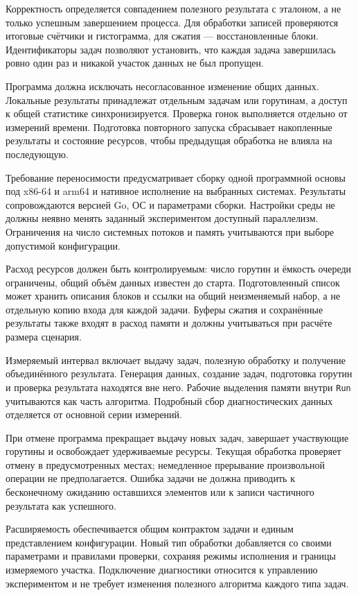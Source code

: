 Корректность определяется совпадением полезного результата с эталоном, а не только успешным
  завершением процесса. Для обработки записей проверяются итоговые счётчики и гистограмма,
  для сжатия — восстановленные блоки. Идентификаторы задач позволяют установить, что каждая
  задача завершилась ровно один раз и никакой участок данных не был пропущен.

Программа должна исключать несогласованное изменение общих данных. Локальные результаты
  принадлежат отдельным задачам или горутинам, а доступ к общей статистике синхронизируется.
  Проверка гонок выполняется отдельно от измерений времени. Подготовка повторного запуска
  сбрасывает накопленные результаты и состояние ресурсов, чтобы предыдущая обработка
  не влияла на последующую.

Требование переносимости предусматривает сборку одной программной основы под x86-64 и arm64
  и нативное исполнение на выбранных системах. Результаты сопровождаются версией Go, ОС
  и параметрами сборки. Настройки среды не должны неявно менять заданный экспериментом
  доступный параллелизм. Ограничения на число системных потоков и память учитываются при
  выборе допустимой конфигурации.

Расход ресурсов должен быть контролируемым: число горутин и ёмкость очереди ограничены,
  общий объём данных известен до старта. Подготовленный список может хранить описания блоков
  и ссылки на общий неизменяемый набор, а не отдельную копию входа для каждой задачи.
  Буферы сжатия и сохранённые результаты также входят в расход памяти и должны учитываться
  при расчёте размера сценария.

Измеряемый интервал включает выдачу задач, полезную обработку и получение объединённого
  результата. Генерация данных, создание задач, подготовка горутин и проверка результата
  находятся вне него. Рабочие выделения памяти внутри \texttt{Run} учитываются как часть
  алгоритма. Подробный сбор диагностических данных отделяется от основной серии измерений.

При отмене программа прекращает выдачу новых задач, завершает участвующие горутины и освобождает
  удерживаемые ресурсы. Текущая обработка проверяет отмену в предусмотренных местах; немедленное
  прерывание произвольной операции не предполагается. Ошибка задачи не должна приводить
  к бесконечному ожиданию оставшихся элементов или к записи частичного результата как успешного.

Расширяемость обеспечивается общим контрактом задачи и единым представлением конфигурации.
  Новый тип обработки добавляется со своими параметрами и правилами проверки, сохраняя
  режимы исполнения и границы измеряемого участка. Подключение диагностики относится к управлению
  экспериментом и не требует изменения полезного алгоритма каждого типа задач.

